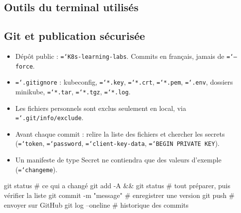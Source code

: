 \documentclass[11pt,a4paper]{article}
\newcommand{\cmd}[1]{\texttt{\hyphenchar\font=`\-#1}}
\begin{document}
\subsection{Outils du terminal utilisés}

\subsection{Git et publication sécurisée}
\begin{itemize}
  \item Dépôt public : \cmd{K8s-learning-labs}. Commits en français, jamais de \cmd{--force}.
  \item \cmd{.gitignore} : kubeconfig, \cmd{*.key}, \cmd{*.crt}, \cmd{*.pem}, \cmd{.env}, dossiers minikube, \cmd{*.tar}, \cmd{*.tgz}, \cmd{*.log}.
  \item Les fichiers personnels sont exclus seulement en local, via \cmd{.git/info/exclude}.
  \item Avant chaque commit : relire la liste des fichiers et chercher les secrets (\cmd{token}, \cmd{password}, \cmd{client-key-data}, \cmd{BEGIN PRIVATE KEY}).
  \item Un manifeste de type Secret ne contiendra que des valeurs d'exemple (\cmd{changeme}).
\end{itemize}
\begin{code}
git status                   # ce qui a changé
git add -A && git status     # tout préparer, puis vérifier la liste
git commit -m "message"      # enregistrer une version
git push                     # envoyer sur GitHub
git log --oneline            # historique des commits
\end{code}
\end{document}
